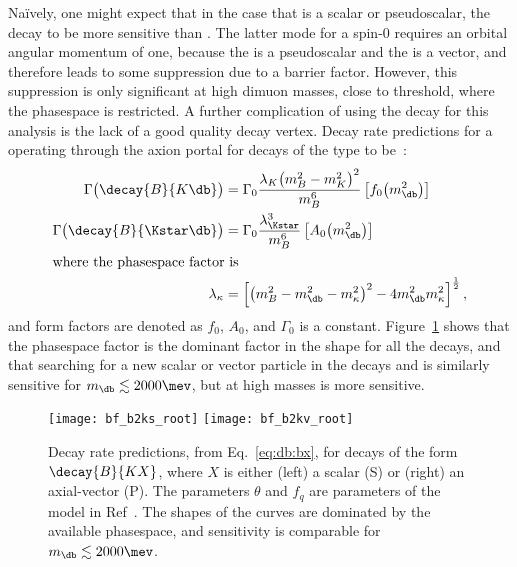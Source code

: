 Na\"{i}vely, one might expect that in the case that \db is a scalar or pseudoscalar, the decay
\decay{\Bd}{\Kp\mumu} to be more sensitive than \btokstrmumu.
The latter mode for a spin-0 \db requires an orbital angular momentum of one, because the \Bd is a
pseudoscalar and the \Kstarz is a vector, and therefore leads to some suppression due to a barrier
factor.
However, this suppression is only significant at high dimuon masses, close to threshold, where
the phasespace is restricted.
A further complication of using the decay \decay{\Bp}{\Kp\mumu} for this analysis is the lack of a
good quality \Bd decay vertex.
Decay rate predictions for a \db operating through the axion portal for decays of the type
 to be~\cite{Batell:2009jf}:
\begin{align}
  \Gamma\big(\decay{B}{K\db}\big) &= \Gamma_0
  \frac{\lambda_{K}\big(m_{B}^2-m_{K}^2\big)^2}{m_{B}^6}
  \left[f_0\!\left(m_\db^2\right)\right]
  \\
  \Gamma\big(\decay{B}{\Kstar\db}\big) &= \Gamma_0
  \frac{\lambda_{\Kstar}^3}{m_{B}^6}
  \left[A_0\!\left(m_\db^2\right)\right]
  \\
  \intertext{where the phasespace factor is}
  \lambda_\kappa &= \left[
    \left( m_B^2 - m_\db^2 - m_\kappa^2 \right)^2
    -4m_\db^2m_\kappa^2
    \right]^\frac12,
    \label{eq:db:bx}
\end{align}
and form factors are denoted as $f_0$, $A_0$, and $\Gamma_0$  is a constant.
Figure~\ref{fig:db:kx} shows that the phasespace factor is the dominant factor in the shape for all
the decays, and that searching for a new scalar or vector particle in the decays
\decay{\Bd}{\Kstarz\db} and \decay{\Bp}{\Kp\db} is similarly sensitive for $m_\db\lesssim2000\mev$,
but at high masses \decay{\Bp}{\Kp\db} is more sensitive.

\begin{figure}
  \begin{center}
    \texttt{[image: bf\_b2ks\_root]}
    \texttt{[image: bf\_b2kv\_root]}
    \caption[Decay rates for decays of the form ]
    {
      Decay rate predictions, from Eq.~\protect\ref{eq:db:bx},
      for decays of the form $\decay{B}{KX}$, where $X$ is either
      (left) a scalar (S) or
      (right) an axial-vector (P).
      The parameters $\theta$ and $f_q$ are parameters of the model in
      Ref~\cite{Batell:2009jf}.
      The shapes of the curves are dominated by the available phasespace, and sensitivity is
      comparable for $m_\db\lesssim2000\mev$.
    }
    \label{fig:db:kx}
  \end{center}
\end{figure}



